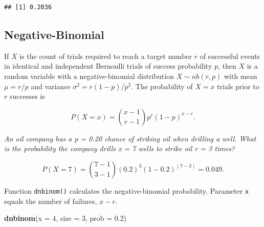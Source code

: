 \documentclass[]{book}
\newenvironment{Shaded}{\begin{snugshade}}{\end{snugshade}}
\newcommand{\DataTypeTok}[1]{\textcolor[rgb]{0.13,0.29,0.53}{#1}}
\newcommand{\DecValTok}[1]{\textcolor[rgb]{0.00,0.00,0.81}{#1}}
\newcommand{\FloatTok}[1]{\textcolor[rgb]{0.00,0.00,0.81}{#1}}
\newcommand{\KeywordTok}[1]{\textcolor[rgb]{0.13,0.29,0.53}{\textbf{#1}}}
\newcommand{\NormalTok}[1]{#1}
\newcommand{\OperatorTok}[1]{\textcolor[rgb]{0.81,0.36,0.00}{\textbf{#1}}}
\newcommand{\StringTok}[1]{\textcolor[rgb]{0.31,0.60,0.02}{#1}}
\begin{document}
\begin{Shaded}
\end{Shaded}

\begin{verbatim}
## [1] 0.2036
\end{verbatim}

\hypertarget{negative-binomial}{%
\subsection{Negative-Binomial}\label{negative-binomial}}

If \(X\) is the count of trials required to reach a target number \(r\) of successful events in identical and independent Bernoulli trials of success probability \(p\), then \(X\) is a random variable with a negative-binomial distribution \(X \sim nb(r,p)\) with mean \(\mu=r/p\) and variance \(\sigma^2 = r(1-p)/p^2\). The probability of \(X=x\) trials prior to \(r\) successes is

\[P(X=x) = {{x - 1} \choose {r - 1}} p^r (1-p)^{x-r}.\]

\emph{An oil company has a p = 0.20 chance of striking oil when drilling a well. What is the probability the company drills x = 7 wells to strike oil r = 3 times?}

\[P(X=7) = {{7 - 1} \choose {3 - 1}} (0.2)^3 (1-0.2)^{(7-3)} = 0.049.\]

Function \texttt{dnbinom()} calculates the negative-binomial probability. Parameter \texttt{x} equals the number of failures, \(x - r\).

\begin{Shaded}
\begin{Highlighting}[]
\KeywordTok{dnbinom}\NormalTok{(}\DataTypeTok{x =} \DecValTok{4}\NormalTok{, }\DataTypeTok{size =} \DecValTok{3}\NormalTok{, }\DataTypeTok{prob =} \FloatTok{0.2}\NormalTok{)}
\end{Highlighting}
\end{Shaded}
\end{document}
